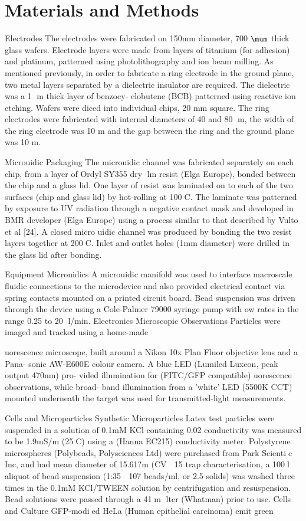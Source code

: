 \section{Materials and Methods}

Electrodes 
The electrodes were fabricated on 150mm diameter, 700 $\mum$ thick glass
wafers. Electrode layers were made from layers of titanium (for adhesion) and platinum,
patterned using photolithography and ion beam milling. As mentioned previously, in
order to fabricate a ring electrode in the ground plane, two metal layers separated by
a dielectric insulator are required. The dielectric was a 1 m thick layer of benzocy-
clobutene (BCB) patterned using reactive ion etching. Wafers were diced into individual
chips, 20 mm square. The ring electrodes were fabricated with internal diameters of 40
and 80 m, the width of the ring electrode was 10 m and the gap between the ring and
the ground plane was 10 m.

Microuidic Packaging 
The microuidic channel was fabricated separately on each
chip, from a layer of Ordyl SY355 dry lm resist (Elga Europe), bonded between the
chip and a glass lid. One layer of resist was laminated on to each of the two surfaces
(chip and glass lid) by hot-rolling at 100C. The laminate was patterned by exposure
to UV radiation through a negative contact mask and developed in BMR developer
(Elga Europe) using a process similar to that described by Vulto et al [24]. A closed
micro
uidic channel was produced by bonding the two resist layers together at 200C.
Inlet and outlet holes (1mm diameter) were drilled in the glass lid after bonding.

Equipment
Microuidics 
A microuidic manifold was used to interface macroscale fluidic connections to the microdevice and also provided electrical contact via spring contacts
mounted on a printed circuit board. Bead suspension was driven through the device
using a Cole-Palmer 79000 syringe pump with 
ow rates in the range 0.25 to 20 l/min.
Electronics
Microscopic Observations Particles were imaged and tracked using a home-made

uorescence microscope, built around a Nikon 10x Plan Fluor objective lens and a Pana-
sonic AW-E600E colour camera. A blue LED (Lumiled Luxeon, peak output 470nm) pro-
vided illumination for (FITC/GFP compatible) 
uorescence observations, while broad-
band illumination from a 'white' LED (5500K CCT) mounted underneath the target
was used for transmitted-light measurements.

Cells and Microparticles
Synthetic Microparticles Latex test particles were suspended in a solution of
0.1mM KCl containing 0.02%
conductivity was measured to be 1.9mS/m (25C) using a (Hanna EC215) conductivity
meter. Polystyrene microspheres (Polybeads, Polysciences Ltd) were purchased from
Park Scientic Inc, and had mean diameter of 15.61?m (CV  15%
trap characterisation, a 100l aliquot of bead suspension (1:35  107 beads/ml, or 2.5%
solids) was washed three times in the 0.1mM KCl/TWEEN solution by centrifugation
and resuspension. Bead solutions were passed through a 41m lter (Whatman) prior
to use.
Cells and Culture GFP-modied HeLa (Human epithelial carcinoma) emit green

